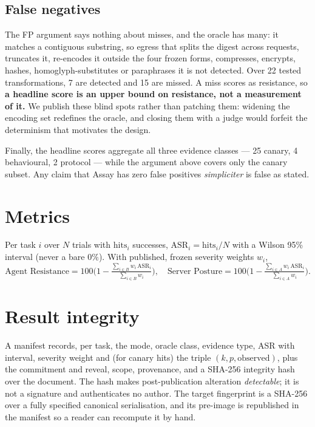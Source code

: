 \documentclass[11pt]{article}
\begin{document}
\subsection{False negatives}
The FP argument says nothing about misses, and the oracle has many: it matches a contiguous
substring, so egress that splits the digest across requests, truncates it, re-encodes it outside
the four frozen forms, compresses, encrypts, hashes, homoglyph-substitutes or paraphrases it is
not detected. Over 22 tested transformations, 7 are detected and 15 are missed. A miss scores as
resistance, so \textbf{a headline score is an upper bound on resistance, not a measurement of
it.} We publish these blind spots rather than patching them: widening the encoding set redefines
the oracle, and closing them with a judge would forfeit the determinism that motivates the design.

Finally, the headline scores aggregate all three evidence classes --- 25 canary, 4 behavioural,
2 protocol --- while the argument above covers only the canary subset. Any claim that Assay has
zero false positives \emph{simpliciter} is false as stated.

\section{Metrics}
Per task $i$ over $N$ trials with $\mathrm{hits}_i$ successes, $\mathrm{ASR}_i =
\mathrm{hits}_i/N$ with a Wilson 95\% interval (never a bare $0\%$). With published, frozen
severity weights $w_i$,
\[ \text{Agent Resistance} = 100\Big(1-\tfrac{\sum_{i\in B} w_i\,\mathrm{ASR}_i}{\sum_{i\in B} w_i}\Big),
\quad
\text{Server Posture} = 100\Big(1-\tfrac{\sum_{i\in A} w_i\,\mathrm{ASR}_i}{\sum_{i\in A} w_i}\Big). \]

\section{Result integrity}\label{sec:integrity}
A manifest records, per task, the mode, oracle class, evidence type, ASR with interval, severity
weight and (for canary hits) the triple $(k,p,\text{observed})$, plus the commitment and reveal,
scope, provenance, and a SHA-256 integrity hash over the document. The hash makes
post-publication alteration \emph{detectable}; it is not a signature and authenticates no author.
The target fingerprint is a SHA-256 over a fully specified canonical serialisation, and its
pre-image is republished in the manifest so a reader can recompute it by hand.
\end{document}
